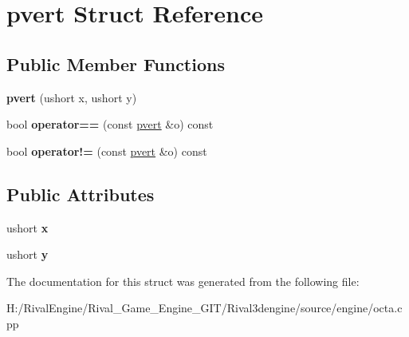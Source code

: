 \hypertarget{structpvert}{}\section{pvert Struct Reference}
\label{structpvert}
\subsection*{Public Member Functions}
\begin{DoxyCompactItemize}
\item 
\mbox{\label{structpvert_a900c79b39d2732b9107b3240af061f15}} 
{\bfseries pvert} (ushort x, ushort y)
\item 
\mbox{\label{structpvert_a26c9138b65f785be15dd0255a6d31cbf}} 
bool {\bfseries operator==} (const \hyperlink{structpvert}{pvert} \&o) const
\item 
\mbox{\label{structpvert_a045a54f03cba752726e62fbc219cc899}} 
bool {\bfseries operator!=} (const \hyperlink{structpvert}{pvert} \&o) const
\end{DoxyCompactItemize}
\subsection*{Public Attributes}
\begin{DoxyCompactItemize}
\item 
\mbox{\label{structpvert_ae8d5aa802626ba153aee7d740b7c28fb}} 
ushort {\bfseries x}
\item 
\mbox{\label{structpvert_a66ecb8778e1381bcd0cd278ef89cdda9}} 
ushort {\bfseries y}
\end{DoxyCompactItemize}


The documentation for this struct was generated from the following file\+:\begin{DoxyCompactItemize}
\item 
H\+:/\+Rival\+Engine/\+Rival\+\_\+\+Game\+\_\+\+Engine\+\_\+\+G\+I\+T/\+Rival3dengine/source/engine/octa.\+cpp\end{DoxyCompactItemize}
